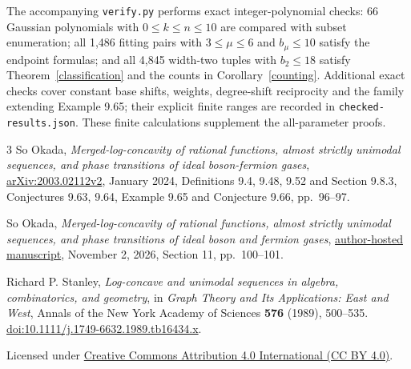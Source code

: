 \documentclass[11pt,a4paper]{article}
\begin{document}
The accompanying \texttt{verify.py} performs exact integer-polynomial
checks: 66 Gaussian polynomials with $0\le k\le n\le10$ are compared
with subset enumeration; all 1,486 fitting pairs with $3\le\mu\le6$
and $b_\mu\le10$ satisfy the endpoint formulas; and all 4,845 width-two
tuples with $b_2\le18$ satisfy Theorem~\ref{classification} and the counts
in Corollary~\ref{counting}. Additional exact checks cover constant base
shifts, weights, degree-shift reciprocity and the family extending Example 9.65;
their explicit finite ranges are recorded in \texttt{checked-results.json}.
These finite calculations supplement the all-parameter proofs.

\begin{thebibliography}{3}
So Okada, \emph{Merged-log-concavity of rational functions, almost strictly
unimodal sequences, and phase transitions of ideal boson-fermion gases},
\href{https://arxiv.org/abs/2003.02112v2}{arXiv:2003.02112v2},
January 2024, Definitions 9.4, 9.48, 9.52 and Section 9.8.3,
Conjectures 9.63, 9.64, Example 9.65 and Conjecture 9.66, pp.~96--97.

So Okada, \emph{Merged-log-concavity of rational functions, almost strictly
unimodal sequences, and phase transitions of ideal boson and fermion gases},
\href{https://so-okada.github.io/research_files/phases.pdf}{author-hosted manuscript},
November 2, 2026, Section 11, pp.~100--101.

Richard P. Stanley, \emph{Log-concave and unimodal sequences in algebra,
combinatorics, and geometry}, in \emph{Graph Theory and Its Applications:
East and West}, Annals of the New York Academy of Sciences \textbf{576}
(1989), 500--535.
\href{https://doi.org/10.1111/j.1749-6632.1989.tb16434.x}{doi:10.1111/j.1749-6632.1989.tb16434.x}.
\end{thebibliography}

\medskip
\noindent\small Licensed under
\href{https://creativecommons.org/licenses/by/4.0/}{Creative Commons Attribution 4.0 International (CC BY 4.0)}.
\end{document}
